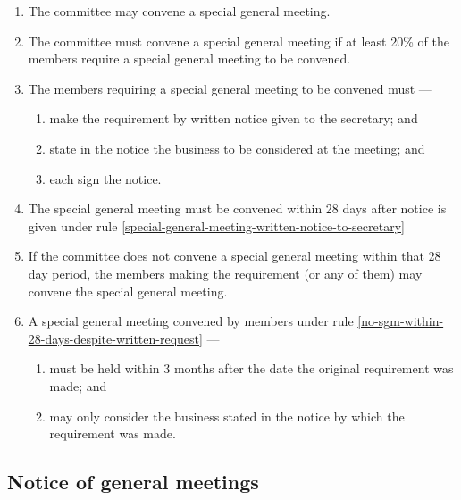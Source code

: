 \documentclass[../constitution.tex]{subfiles}
\begin{document}
\begin{enumerate}

\item The committee may convene a special general meeting.
\item The committee must convene a special general meeting if at least 20\% of the members require a special general meeting to be convened.
\item The members requiring a special general meeting to be convened must ---

  \begin{enumerate}
  
  \item make the requirement by written notice given to the secretary; and \label{special-general-meeting-written-notice-to-secretary}
  \item state in the notice the business to be considered at the meeting; and
  \item each sign the notice.
  \end{enumerate}
\item The special general meeting must be convened within 28 days after notice is given under rule \ref{special-general-meeting-written-notice-to-secretary}
\item If the committee does not convene a special general meeting within that 28 day period, the members making the requirement (or any of them) may convene the special general meeting. \label{no-sgm-within-28-days-despite-written-request}
\item A special general meeting convened by members under rule \ref{no-sgm-within-28-days-despite-written-request} ---

  \begin{enumerate}
  
  \item must be held within 3 months after the date the original requirement was made; and
  \item may only consider the business stated in the notice by which the requirement was made.
  \end{enumerate}
\end{enumerate}

\hypertarget{notice-of-general-meetings}{%
\subsection{Notice of general meetings}\label{notice-of-general-meetings}}
\end{document}

